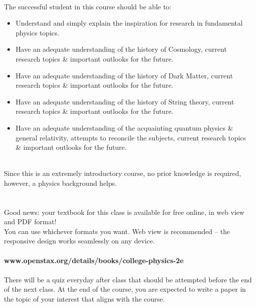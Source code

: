 \documentclass[11pt]{article}
\begin{document}
\medskip{}\\
The successful student in this course should be able to:
\begin{itemize}
	\item Understand and simply explain the inspiration for research in fundamental physics topics.
	\item Have an adequate understanding of the history of Cosmology, current research topics \& important outlooks for the future.
	\item Have an adequate understanding of the history of Dark Matter, current research topics \& important outlooks for the future.
	\item Have an adequate understanding of the history of String theory, current research topics \& important outlooks for the future.
	\item Have an adequate understanding of the acquainting quantum physics \& general relativity, attempts to reconcile the subjects, current research topics \& important outlooks for the future.
\end{itemize}

\\ 
Since this is an extremely introductory course, no prior knowledge is required, however, a physics background helps.\\

\\ \\
Good news: your textbook for this class is available for free online, in web view and PDF format!\\
You can use whichever formats you want. Web view is recommended -- the responsive design works seamlessly on any device.\\ \\
\textbf{www.openstax.org/details/books/college-physics-2e}\\

\\ 
There will be a quiz everyday after class that should be attempted before the end of the next class. At the end of the course, you are expected to write a paper in the topic of your interest that aligns with the course.\\ \\
\end{document}
